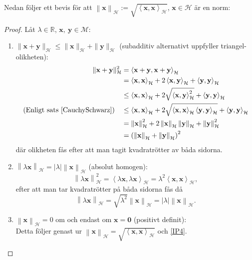 \documentclass[a4paper, 12pt]{report}
\theoremstyle{definition}
\theoremstyle{remark}
\newcommand{\bfx}{\mathbf{x}}
\newcommand{\llangle}{\left\langle}
\newcommand{\rrangle}{\right\rangle}
\begin{document}
Nedan följer ett bevis för att $\left\| \bfx \right\|_\mathcal{H} := \sqrt{\llangle \bfx , \bfx \rrangle_\mathcal{H}}$, $\bfx \in\mathcal{H}$ är en norm:
\begin{proof}
	Låt $\lambda \in \mathbb{R}$, $\bfx,~\mathbf{y}\in \mathcal{M}$:
	\begin{enumerate}[label=\textbf{N\arabic*}:]
		\item $\| \bfx + \mathbf{y}\|_\mathcal{H} \leq \| \bfx \|_\mathcal{H} + \| \mathbf{y}\|_\mathcal{H}$ (subadditiv alternativt uppfyller triangel-olikheten): 
		\begin{align*}
			\| \bfx + \mathbf{y}\|_\mathcal{H}^2 &= \llangle \bfx + \mathbf{y}, \bfx + \mathbf{y}\rrangle_\mathcal{H}\\
			&= \llangle \bfx, \bfx \rrangle_\mathcal{H} + 2 \llangle \bfx, \mathbf{y}\rrangle_\mathcal{H} + \llangle \mathbf{y}, \mathbf{y} \rrangle_\mathcal{H}\\
			&\leq \llangle \bfx, \bfx \rrangle_\mathcal{H} + 2\sqrt{\llangle \bfx, \mathbf{y}\rrangle^2_\mathcal{H}} + \llangle \mathbf{y}, \mathbf{y} \rrangle_\mathcal{H}\\
			\text{(Enligt sats \ref{CauchySchwarz})}\quad&\leq \llangle \bfx, \bfx \rrangle_\mathcal{H} + 2\sqrt{\llangle \bfx, \bfx\rrangle_ \mathcal{H} \llangle \mathbf{y}, \mathbf{y} \rrangle_\mathcal{H}} + \llangle \mathbf{y}, \mathbf{y} \rrangle_\mathcal{H}\\
			&=\left\|\bfx \right\|^2_\mathcal{H} + 2\left\|\bfx \right\|_\mathcal{H}\left\|\mathbf{y} \right\|_\mathcal{H}  + \left\| \mathbf{y}\right\|^2_\mathcal{H}\\
			&= \left(\left\|\bfx \right\|_\mathcal{H}+ \left\| \mathbf{y}\right\|_\mathcal{H}\right)^2
		\end{align*}
		där olikheten fås efter att man tagit kvadratrötter av båda sidorna.
		\item $\left\| \lambda\bfx \right\|_\mathcal{H} = \left|\lambda\right|\left\| \bfx \right\|_\mathcal{H}$ (absolut homogen):
		\begin{equation}
			\left\| \lambda\bfx \right\|_\mathcal{H}^2 = \llangle \lambda \bfx, \lambda \bfx \rrangle_\mathcal{H}
			= \lambda^2 \llangle \bfx, \bfx \rrangle_\mathcal{H},
		\end{equation}
		efter att man tar kvadratrötter på båda sidorna fås då
		\begin{equation*}
			\left\| \lambda\bfx \right\|_\mathcal{H} = \sqrt{\lambda^2}\left\| \bfx \right\|_\mathcal{H} = \left|\lambda\right| \left\| \bfx \right\|_\mathcal{H}.
		\end{equation*}
		\item $\left\| \bfx \right\|_\mathcal{H}=0$ om och endast om $\bfx = \mathbf{0}$ (positivt definit):\\
		Detta följer genast ur $\left\| \bfx \right\|_\mathcal{H} = \sqrt{\llangle \bfx, \bfx \rrangle_\mathcal{H}}$ och \ref{IP4}. \qedhere
	\end{enumerate}
\end{proof}
\end{document}
